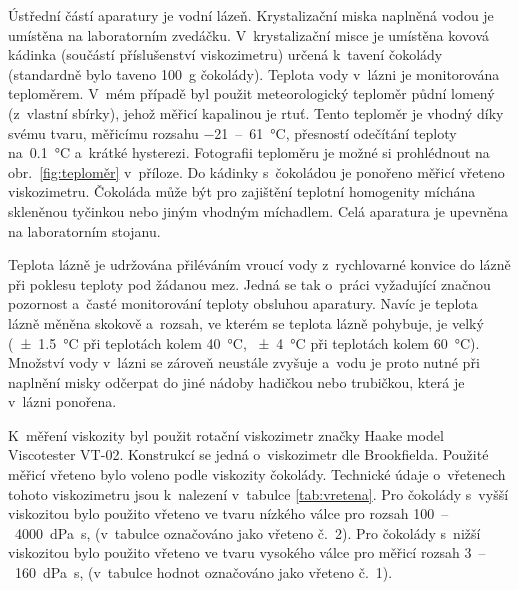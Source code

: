 \documentclass[12pt]{article}
\begin{document}
Ústřední částí aparatury je vodní lázeň. Krystalizační miska naplněná vodou je umístěna na laboratorním zvedáčku. V~krystalizační misce je umístěna kovová kádinka (součástí příslušenství viskozimetru) určená k~tavení čokolády (standardně bylo taveno \SI{100}{\gram} čokolády). Teplota vody v~lázni je monitorována teploměrem. \label{sec:teploměr}
V~mém případě byl použit meteorologický teploměr půdní lomený (z~vlastní sbírky), jehož měřicí kapalinou je rtuť. Tento teploměr je vhodný díky svému tvaru, měřicímu rozsahu \SI{-21}{}~--~\SI{61}{\degreeCelsius}, přesností odečítání teploty na~\SI{0,1}{\degreeCelsius} a~krátké hysterezi. Fotografii teploměru je možné si prohlédnout na obr.~\ref{fig:teploměr} v~příloze. Do kádinky s~čokoládou je ponořeno měřicí vřeteno viskozimetru. Čokoláda může být pro zajištění teplotní homogenity míchána skleněnou tyčinkou nebo jiným vhodným míchadlem. Celá aparatura je upevněna na laboratorním stojanu.
\par\noindent
Teplota lázně je udržována přiléváním vroucí vody z~rychlovarné konvice do lázně při poklesu teploty pod žádanou mez. Jedná se tak o~práci vyžadující značnou pozornost a~časté monitorování teploty obsluhou aparatury. Navíc je teplota lázně měněna skokově a~rozsah, ve kterém se teplota lázně pohybuje, je velký (\SI{\pm 1,5}{\degreeCelsius} při teplotách kolem \SI{40}{\degreeCelsius}, \SI{\pm 4}{\degreeCelsius} při teplotách kolem \SI{60}{\degreeCelsius}). Množství vody v~lázni se zároveň neustále zvyšuje a~vodu je proto nutné při naplnění misky odčerpat do jiné nádoby hadičkou nebo trubičkou, která je v~lázni ponořena.
\par
\label{Vřetena}
\noindent
K~měření viskozity byl použit rotační viskozimetr značky Haake model Viscotester VT-02. Konstrukcí se jedná o~viskozimetr dle Brookfielda. Použité měřicí vřeteno bylo voleno podle viskozity čokolády. Technické údaje o~vřetenech tohoto viskozimetru jsou k~nalezení v~tabulce \ref{tab:vretena}. Pro čokolády s~vyšší viskozitou bylo použito vřeteno ve tvaru nízkého válce pro rozsah \SI{100}{}~--~\SI{4000}{\deci\pascal\second}, (v~tabulce označováno jako vřeteno č.~2). Pro čokolády s~nižší viskozitou bylo použito vřeteno ve tvaru vysokého válce pro měřicí rozsah \SI{3}{}~--~\SI{160}{\deci\pascal\second}, (v~tabulce hodnot označováno jako vřeteno č.~1).~\cite{man:VT-02}
\end{document}
